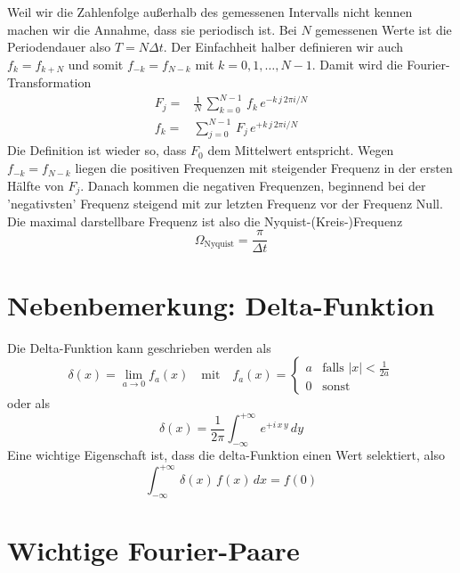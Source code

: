 Weil wir die Zahlenfolge außerhalb des gemessenen Intervalls nicht kennen machen wir die Annahme, dass sie periodisch ist. Bei $N$ gemessenen Werte ist die Periodendauer also $T = N \Delta t$. Der Einfachheit halber definieren wir auch $f_k = f_{k + N}$ und somit $f_{-k} = f_{N - k}$ mit $k= 0, 1, \dots, N-1$. Damit wird die Fourier-Transformation
\begin{align}
 F_j = & \frac{1}{N} \, \sum_{k=0}^{N-1} \, f_k \, e^{- k \, j \, 2 \pi i / N } \\
  f_k = &  \sum_{j=0}^{N-1} \, F_j \, e^{+ k \,  j \, 2 \pi i / N } 
\end{align}
Die Definition ist wieder so, dass $F_0$ dem Mittelwert entspricht. Wegen $f_{-k} = f_{N - k}$ liegen die positiven Frequenzen mit steigender Frequenz in der ersten Hälfte von $F_j$. Danach kommen die negativen Frequenzen, beginnend bei der 'negativsten' Frequenz steigend mit zur letzten Frequenz vor der Frequenz Null. Die maximal darstellbare Frequenz ist also die Nyquist-(Kreis-)Frequenz
\begin{equation}
\Omega_\text{Nyquist} = \frac{\pi}{\Delta t}
\end{equation}


\section{Nebenbemerkung: Delta-Funktion}

Die Delta-Funktion kann geschrieben werden als
\begin{equation}
  \delta(x) = \lim_{a \rightarrow 0} f_a(x) \quad
   \text{mit} \quad
    f_a(x) = \left\{ \begin{matrix}
    a  & \text{falls } |x| < \frac{1}{2a} \\
    0 & \text{sonst}
    \end{matrix}
    \right.
\end{equation}
oder als
\begin{equation}
\delta(x)  = \frac{1}{2 \pi}  \int_{-\infty}^{+\infty} \, e^{+ i\, x \, y} \, dy
\end{equation}
Eine wichtige Eigenschaft ist, dass die delta-Funktion einen Wert selektiert, also 
\begin{equation}
 \int_{-\infty}^{+\infty} \, \delta(x) \, f(x) \, dx = f(0)
\end{equation}


\section{Wichtige Fourier-Paare}


